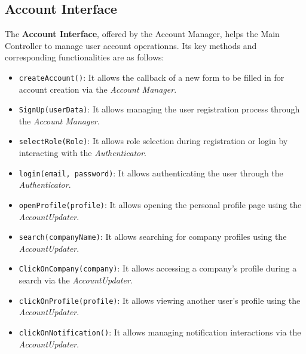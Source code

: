 \subsection{Account Interface}
The \textbf{Account Interface}, offered by the Account Manager, helps the Main Controller to manage user account operationns. Its key methods and corresponding functionalities are as follows:
\begin{itemize}
    \item \texttt{createAccount()}: It allows the callback of a new form to be filled in for account creation via the \textit{Account Manager}.
    \item \texttt{SignUp(userData)}: It allows managing the user registration process through the \textit{Account Manager}.
    \item \texttt{selectRole(Role)}: It allows role selection during registration or login by interacting with the \textit{Authenticator}.
    \item \texttt{login(email, password)}: It allows authenticating the user through the \textit{Authenticator}.
    \item \texttt{openProfile(profile)}: It allows opening the personal profile page using the \textit{AccountUpdater}.
    \item \texttt{search(companyName)}: It allows searching for company profiles using the \textit{AccountUpdater}.
    \item \texttt{ClickOnCompany(company)}: It allows accessing a company’s profile during a search via the \textit{AccountUpdater}.
    \item \texttt{clickOnProfile(profile)}: It allows viewing another user’s profile using the \textit{AccountUpdater}.
    \item \texttt{clickOnNotification()}: It allows managing notification interactions via the \textit{AccountUpdater}.
\end{itemize}

